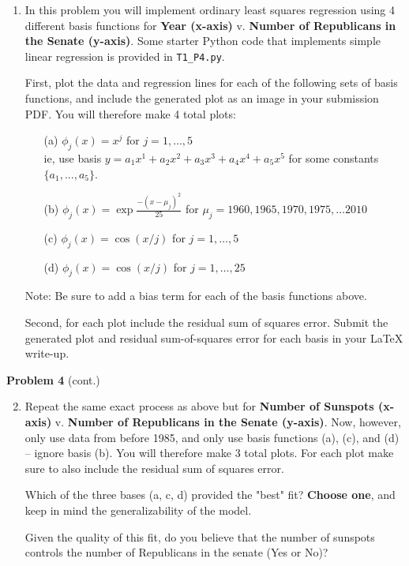 \documentclass[submit]{harvardml}
\begin{document}
\begin{problem}
\begin{enumerate}
\item In this problem you will implement ordinary least squares regression using 4 different basis functions for
\textbf{Year (x-axis)} v. \textbf{Number of Republicans in the Senate (y-axis)}. Some starter Python code
that implements simple linear regression is provided in \verb|T1_P4.py|.

First, plot the data and regression lines for each of the following sets of basis functions, and include
the generated plot as an image in your submission PDF. You will therefore make 4 total plots:
\begin{enumerate}
	\item[(a)] $\phi_j(x) = x^j$ for $j=1, \ldots, 5$\\
    ie, use basis $y = a_1 x^1 + a_2 x^2 + a_3 x^3 + a_4 x^4 + a_5 x^5$ for some constants $\{a_1, ..., a_5\}$.
    \item[(b)] $\phi_j(x) = \exp{\frac{-(x-\mu_j)^2}{25}}$ for $\mu_j=1960, 1965, 1970, 1975, \ldots 2010$
	\item[(c)] $\phi_j(x) = \cos(x / j)$ for $j=1, \ldots, 5$
	\item[(d)] $\phi_j(x) = \cos(x / j)$ for $j=1, \ldots, 25$
\end{enumerate}
\vspace{-2mm}
{\footnotesize * Note: Be sure to add a bias term for each of the basis functions above.}

Second, for each plot include the residual sum of squares error. Submit the generated plot and residual sum-of-squares error for each basis in your LaTeX write-up.
\end{enumerate}

\end{problem}

\begin{framed}
\noindent\textbf{Problem 4} (cont.)\\
\begin{enumerate}
\setcounter{enumi}{1}
\item Repeat the same exact process as above but for \textbf{Number of Sunspots (x-axis)} v. \textbf{Number of Republicans in the Senate (y-axis)}.
Now, however, only use data from before 1985, and only use basis functions (a), (c), and (d) -- ignore basis (b). You will therefore make 3 total plots. For each plot make sure to also include the residual sum of squares error.

Which of the three bases (a, c, d) provided the "best" fit? \textbf{Choose one}, and keep in mind the generalizability of the model.

Given the quality of this fit, do you believe that the number of sunspots controls the number of Republicans in the senate (Yes or No)?
\end{enumerate}
\end{framed}
\end{document}
